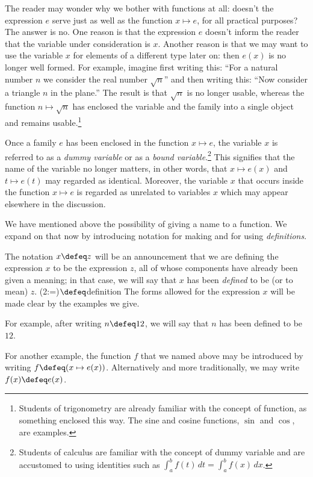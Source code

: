 The reader may wonder why we bother with functions at all: doesn't the expression $e$ serve just as well as the function $x \mapsto e$, for all
practical purposes?  The answer is no.  One reason is that the expression $e$ doesn't inform the reader that the variable under consideration is
$x$.  Another reason is that we may want to use the variable $x$ for elements of a different type later on: then $e(x)$ is no longer well
formed.  For example, imagine first writing this: ``For a natural number $n$ we consider the real number $\sqrt n$'' and then writing this:
``Now consider a triangle $n$ in the plane.''  The result is that $\sqrt n$ is no longer usable, whereas the function $n \mapsto \sqrt n$ has
enclosed the variable and the family into a single object and remains usable.\footnote{Students of trigonometry are already familiar with the
concept of function, as something enclosed this way.  The sine and cosine functions, $\sin$ and $\cos$, are examples.}

Once a family $e$ has been enclosed in the function $x \mapsto e$, the variable $x$ is referred to as a \emph{dummy variable} or as a \emph{bound variable}.\footnote{Students of calculus are familiar with the concept of dummy variable
and are accustomed to using identities such as $\int_a^b f(t)\,dt = \int_a^b f(x)\,dx$.} This signifies that the name of the variable no longer
matters, in other words, that $x \mapsto e(x)$ and $t \mapsto e(t)$ may regarded as identical.  Moreover, the variable $x$ that occurs inside
the function $x \mapsto e$ is regarded as unrelated to variables $x$ which may appear elsewhere in the discussion.

We have mentioned above the possibility of giving a name to a function.
We expand on that now by introducing notation for making and for using \emph{definitions}.

The notation $x \defeq z$ will be an announcement that we are defining
the expression $x$ to be the expression $z$, all of whose components have already been given a meaning;
in that case, we will say that $x$ has been \emph{defined} to be (or to mean) $z$.%
\glossary(2:=){$\protect\defeq$}{definition}
The forms allowed for the expression $x$ will be made clear by the examples we give.

For example, after writing $n \defeq 12$, we will say that $n$ has been defined to be $12$.

For another example, the function $f$ that we named above may be introduced by writing $f \defeq ( x \mapsto e(x) )$.
Alternatively and more traditionally, we may write $f(x) \defeq e(x)$.

